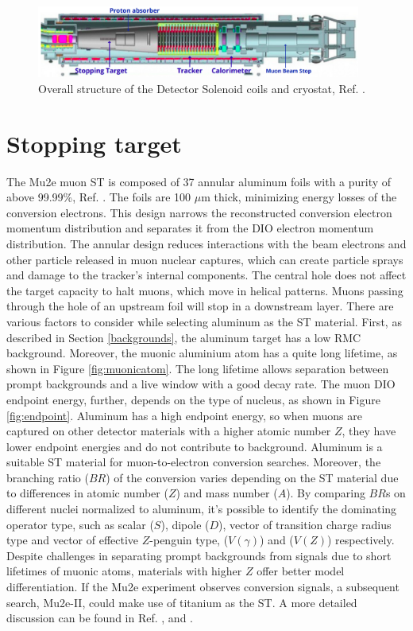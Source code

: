 \begin{figure}[!h]
\centering
\includegraphics[width =0.95\textwidth]{figures/png/Screenshot_20240306_225639.png}
\caption{Overall structure of the Detector Solenoid coils and cryostat, Ref. \cite{bobbb}.}
\label{fig:DS}
\end{figure}
\section{Stopping target}
The Mu2e muon ST is composed of 37 annular aluminum foils  with a purity of above 99.99\%, Ref. \cite{bobbb}. The foils are 100 $\mu$m thick, minimizing energy losses of the conversion electrons. This design narrows the reconstructed conversion electron momentum distribution and separates it from the DIO electron momentum distribution. The annular design reduces interactions with the beam electrons and other particle released in muon nuclear captures, which can create particle sprays and damage to the tracker's internal components. The central hole does not affect the target capacity to halt muons, which move in helical patterns. Muons passing through the hole of an upstream foil will stop in a downstream layer. There are various factors to consider while selecting aluminum as the ST material. First, as described in Section \ref{backgrounds}, the aluminum target has a low RMC background. Moreover, the muonic aluminium atom has a quite long lifetime, as shown in Figure \ref{fig:muonicatom}. The long lifetime allows separation between prompt backgrounds and a live window with a good decay rate. The muon DIO endpoint energy, further, depends on the type of nucleus, as shown in Figure \ref{fig:endpoint}. Aluminum has a high endpoint energy, so when muons are captured on other detector materials with a higher atomic number $Z$, they have lower endpoint energies and do not contribute to background. Aluminum is a suitable ST material for muon-to-electron conversion searches.
Moreover, the branching ratio ($BR$) of the conversion varies depending on the ST material due to differences in atomic number ($Z$) and mass number ($A$). By comparing $BR$s on different nuclei normalized to aluminum, it's possible to identify the dominating operator type, such as scalar ($S$), dipole ($D$), vector of transition charge radius type and vector of effective $Z$-penguin type, ($V(\gamma)$) and ($V(Z)$) respectively. Despite challenges in separating prompt backgrounds from signals due to short lifetimes of muonic atoms, materials with higher $Z$ offer better model differentiation. If the Mu2e experiment observes conversion signals, a subsequent search, Mu2e-II, could make use of titanium as the ST. A more detailed discussion can be found in Ref. \cite{PhysRevD.80.013002}, \cite{PhysRevD.76.059902} and \cite{abusalma2018expression}.

